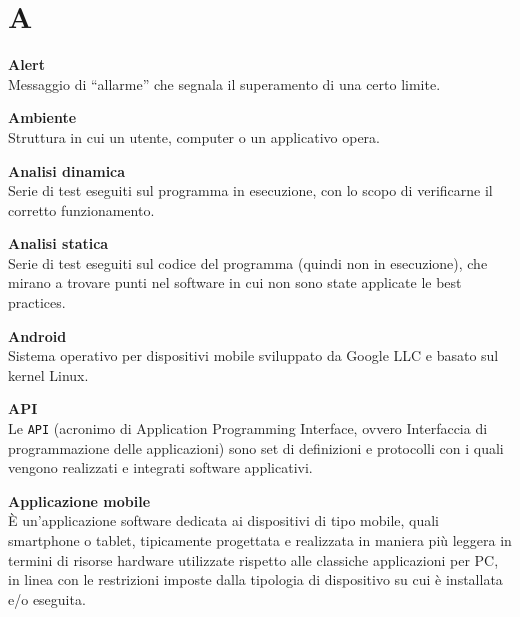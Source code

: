 \documentclass[a4paper, oneside, openany, dvipsnames, table, 12pt]{article}
\begin{document}
\copertina{}

\renewcommand{\arraystretch}{1.5}



\newpage
\tableofcontents
\newpage

\newpage
\section{A}  
\label{par:alert}
\textbf{Alert} \\
Messaggio di “allarme” che segnala il superamento di una certo limite.

\textbf{Ambiente} \\
Struttura in cui un utente, computer o un applicativo opera.

\textbf{Analisi dinamica} \\
Serie di test eseguiti sul programma in esecuzione, con lo scopo di verificarne il corretto funzionamento.  

\textbf{Analisi statica} \\
Serie di test eseguiti sul codice del programma (quindi non in esecuzione), che mirano a trovare punti nel software in cui non sono state applicate le best practices\glo.

\textbf{Android} \\
Sistema operativo per dispositivi mobile sviluppato da Google LLC e basato sul kernel Linux.

\textbf{API} \\
Le \texttt{API} (acronimo di Application Programming Interface, ovvero Interfaccia di programmazione delle applicazioni) sono set di definizioni e protocolli con i quali vengono realizzati e integrati software applicativi. 

\textbf{Applicazione mobile} \\
È un'applicazione software dedicata ai dispositivi di tipo mobile, quali smartphone o tablet, tipicamente progettata e realizzata in maniera più leggera in termini di risorse hardware utilizzate rispetto alle classiche applicazioni per PC, in linea con le restrizioni imposte dalla tipologia di dispositivo su cui è installata e/o eseguita. 
\end{document}
